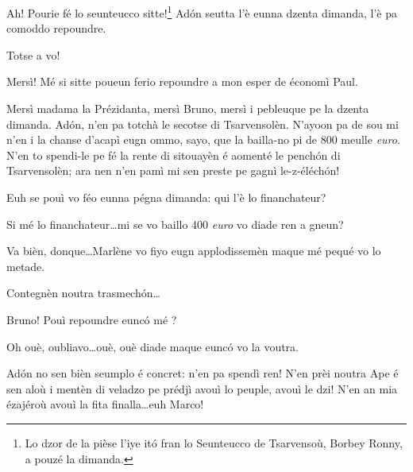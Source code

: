 \begin{drama}
\Brunospeaks Ah! Pourie fé lo seunteucco sitte!\footnote{ Lo dzor de la pièse l'iye it\'o fran lo Seunteucco de Tsarvensoù, Borbey Ronny, a pouzé la dimanda.}  Ad\'on seutta l'è eunna dzenta dimanda, l'è pa comoddo repoundre. 


\Brunospeaks {} Totse a vo!

\Presidanspeaks Mersì! Mé si sitte poueun ferio repoundre a mon esper de économì Paul.

\Dallasspeaks {} Mersì madama la Prézidanta, mersì Bruno, mersì i pebleuque pe la dzenta dimanda. Ad\'on, n'en pa totchà le secotse di Tsarvensolèn. N'ayoon pa de sou mi n'en i la chanse d'acapì eugn ommo, sayo, que la bailla-no pi de 800 meulle \textit{euro}. N'en to spendi-le pe fé la rente di sitouayèn é aomenté le pench\'on di Tsarvensolèn; ara nen n'en pamì mi sen preste pe gagnì le-z-éléch\'on!

\Brunospeaks Euh se pouì vo féo eunna pégna dimanda: qui l'è lo financhateur?


\Dallasspeaks{} Si mé lo financhateur\ldots mi se vo baillo  400 \textit{euro} vo diade ren a gneun?


\Brunospeaks Va bièn, donque\ldots Marlène vo fiyo eugn applodissemèn maque mé pequé vo lo metade.


\Brunospeaks Contegnèn noutra trasmech\'on\ldots

\Jordyspeaks Bruno!  Pouì repoundre eunc\'o mé ?

\Brunospeaks  Oh ouè, oubliavo\ldots ouè, ouè diade maque eunc\'o vo la voutra.

\Jordyspeaks  Ad\'on no sen bièn seumplo é concret: n'en pa spendì ren! N'en prèi noutra Ape é sen aloù i mentèn di veladzo pe prédjì avouì lo peuple, avouì le dzi! N'en an mia ézajéroù avouì la fita finalla\ldots euh Marco!


\end{drama}
